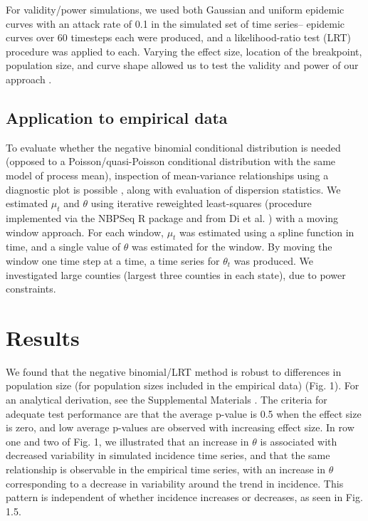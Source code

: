 \documentclass[10pt,letterpaper]{article}
\begin{document}
For validity/power simulations, we used both Gaussian and uniform epidemic curves with an attack rate of 0.1 in the simulated set of time series-- epidemic curves over 60 timesteps each were produced, and a likelihood-ratio test (LRT) procedure was applied to each. 
Varying the effect size, location of the breakpoint, population size, and curve shape allowed us to test the validity and power of our approach .

\subsection*{Application to empirical data}
To evaluate whether the negative binomial conditional distribution is needed (opposed to a Poisson/quasi-Poisson conditional distribution with the same model of process mean), inspection of mean-variance relationships using a diagnostic plot is possible \cite{ver_hoef_quasi-poisson_2007}, along with evaluation of dispersion statistics.
We estimated \begin{math}\mu_t\end{math} and \begin{math}\theta\end{math} using iterative reweighted least-squares (procedure implemented via the NBPSeq R package \cite{NBPSeq} and from Di et al. \cite{yanming_nbp_2011}) with a moving window approach.
For each window, \begin{math}\mu_t\end{math} was estimated using a spline function in time, and a single value of \begin{math}\theta\end{math} was estimated for the window. 
By moving the window one time step at a time, a time series for \begin{math}\theta_t\end{math} was produced. We investigated large counties (largest three counties in each state), due to power constraints.

\section*{Results}
We found that the negative binomial/LRT method is robust to differences in population size (for population sizes included in the empirical data) (Fig. 1).
For an analytical derivation, see the Supplemental Materials .
The criteria for adequate test performance are that the average p-value is 0.5 when the effect size is zero, and low average p-values are observed with increasing effect size. 
In row one and two of Fig. 1, we illustrated that an increase in \begin{math}\theta\end{math} is associated with decreased variability in simulated incidence time series, and that the same relationship is observable in the empirical time series, with an increase in \begin{math}\theta\end{math} corresponding to a decrease in variability around the trend in incidence. This pattern is independent of whether incidence increases or decreases, as seen in Fig. 1.5.
\end{document}
